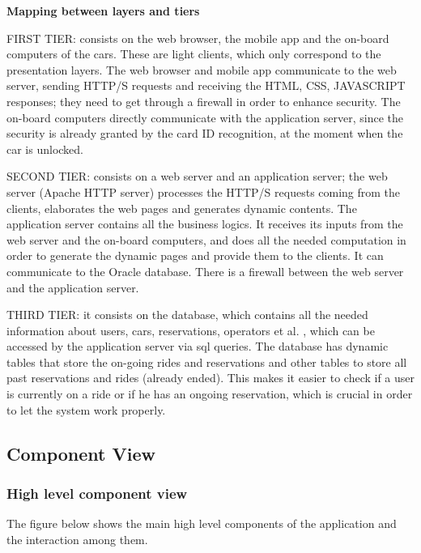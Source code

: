 \documentclass{article}
\begin{document}
\begin{flushleft}
\textbf{Mapping between layers and tiers}
\begin{description}
\item FIRST TIER: consists on the web browser, the mobile app and the on-board computers of the cars. These are light clients, which only correspond to the presentation layers. The web browser and mobile app communicate to the web server, sending HTTP/S requests and receiving the HTML, CSS, JAVASCRIPT responses;  they need to get through a firewall in order to enhance security. The on-board computers directly communicate with the application server, since the security is already granted by the card ID recognition, at the moment when the car is unlocked.
\item SECOND TIER: consists on a web server and an application server; the web server (Apache HTTP server) processes the HTTP/S requests coming from the clients, elaborates the web pages and generates dynamic contents. The application server contains all the business logics. It receives its inputs from the web server and the on-board computers, and does all the needed computation in order to generate the dynamic pages and  provide them 
to the clients. It can communicate to the Oracle database. There is a firewall between the web server and the application server.
\item THIRD TIER:  it consists on the database, which contains all the needed information about users, cars, reservations, operators et al. , which can be accessed by the application server via sql queries. The database has dynamic tables that store the on-going rides and reservations  and other tables to store all past reservations and rides (already ended). This makes it easier to check if a user is currently on a ride or if he has an ongoing reservation, which is crucial in order to let the system work properly.


\end{description}







\subsection{Component View}  %
\subsubsection{High level component view} %
The figure below shows the main high level components of the application and the interaction among them.
\vspace{1.5cm}



\end{flushleft}
\end{document}
